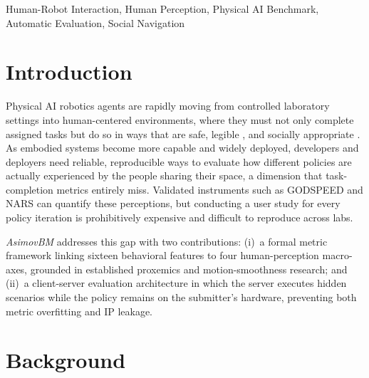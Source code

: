 \documentclass[conference]{IEEEtran}
\begin{document}

\begin{IEEEkeywords}
	Human-Robot Interaction, Human Perception, Physical AI Benchmark,
	Automatic Evaluation, Social Navigation
\end{IEEEkeywords}


\section{Introduction}

Physical AI robotics agents are rapidly moving from controlled laboratory
settings into human-centered environments, where they must not only complete
assigned tasks but do so in ways that are safe, legible \cite{dragan2013legibility,wang2025effectsrobotcompetencymotion}, and socially
appropriate \cite{dautenhahn2007socially}.
As embodied systems become more capable and widely deployed, developers and
deployers need reliable, reproducible ways to evaluate how different policies
are actually experienced by the people sharing their space, a dimension that
task-completion metrics entirely miss.
Validated instruments such as GODSPEED \cite{bartneck2009godspeed} and NARS \cite{nomura2006nars} can quantify
these perceptions, but conducting a user study for every policy iteration is
prohibitively expensive and difficult to reproduce across labs.

\textit{AsimovBM} addresses this gap with two contributions: (i)~a formal
metric framework linking sixteen behavioral features to four
human-perception macro-axes, grounded in established proxemics and
motion-smoothness research; and (ii)~a client-server evaluation architecture
in which the server executes hidden scenarios while the policy remains on
the submitter's hardware, preventing both metric overfitting and IP leakage.


\section{Background}
\end{document}

